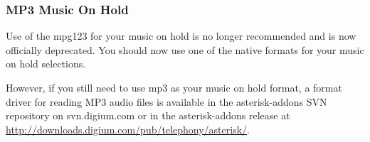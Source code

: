 \subsubsection{MP3 Music On Hold}

Use of the mpg123 for your music on hold is no longer recommended and is now
officially deprecated.  You should now use one of the native formats for your
music on hold selections.

However, if you still need to use mp3 as your music on hold format, a format
driver for reading MP3 audio files is available in the asterisk-addons SVN
repository on svn.digium.com or in the asterisk-addons release at
\url{http://downloads.digium.com/pub/telephony/asterisk/}.

